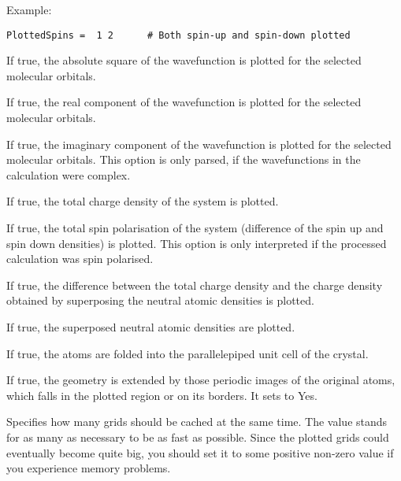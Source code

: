 \begin{description}
Example:
\begin{verbatim}
PlottedSpins =  1 2      # Both spin-up and spin-down plotted
\end{verbatim}

\item[\is{ChargeDensity}] If true, the absolute square of the
  wavefunction is plotted for the selected molecular orbitals.

\item[\is{RealComponent}] If true, the real component of the
  wavefunction is plotted for the selected molecular orbitals.

\item[\is{ImagComponent}] If true, the imaginary component of the
  wavefunction is plotted for the selected molecular orbitals. This
  option is only parsed, if the wavefunctions in the \dftbp{}
  calculation were complex.

\item[\is{TotalChargeDensity}] If true, the total charge density of
  the system is plotted.

\item[\is{TotalSpinPolarisation} / \kw{TotalSpinPolarization}] If
  true, the total spin polarisation of the system (difference of the
  spin up and spin down densities) is plotted. This option is only
  interpreted if the processed \dftbp{} calculation was spin
  polarised.

\item[\is{TotalChargeDifference}] If true, the difference between the
  total charge density and the charge density obtained by superposing
  the neutral atomic densities is plotted.

\item[\is{TotalAtomicDensity}] If true, the superposed neutral atomic
  densities are plotted.

\item[\is{FoldAtomsToUnitCell}] If true, the atoms are folded into the
  parallelepiped unit cell of the crystal.

\item[\is{FillBoxWithAtoms}] If true, the geometry is extended by those
  periodic images of the original atoms, which falls in the plotted
  region or on its borders.  It sets  to Yes.

\item[\is{NrOfCachedGrids}] Specifies how many grids should be cached
  at the same time. The value  stands for as many as necessary
  to be as fast as possible. Since the plotted grids could eventually
  become quite big, you should set it to some positive non-zero value
  if you experience memory problems.


\end{description}
